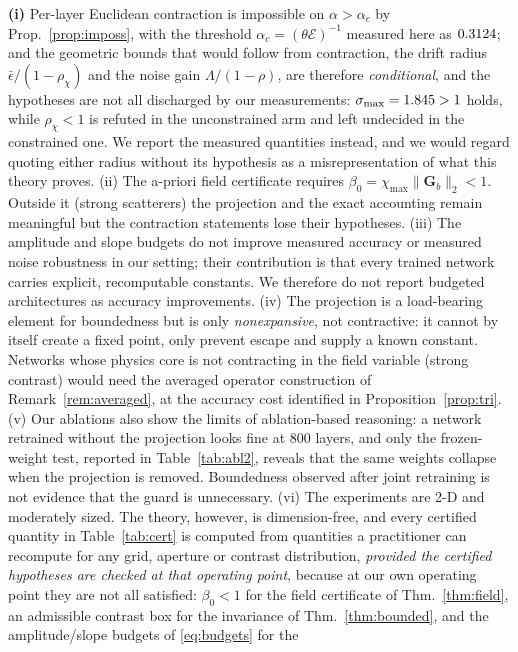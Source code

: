 \documentclass[journal,cmes,article,submit,moreauthors,pdftex]{Definitions/tsp}
\newcommand{\norm}[1]{\lVert #1 \rVert}
\newcommand{\numv}[1]{#1}
\begin{document}
\noindent\textbf{(i)} Per-layer Euclidean contraction is impossible on $\alpha>\alpha_c$ by Prop.~\ref{prop:imposs}, with the
threshold $\alpha_c=(\theta\mathcal{E})^{-1}$ measured here as $\numv{\NumAlphaC}$; and the geometric
bounds that would follow from contraction, the drift radius $\bar\epsilon/(1-\rho_\chi)$ and the
noise gain $\Lambda/(1-\rho)$, are therefore \emph{conditional}, and the hypotheses are not all
discharged by our measurements: $\sigma_{\max}=\numv{\NumPhysSigma}>1$ holds, while $\rho_\chi<1$
is refuted in the unconstrained arm and left undecided in the constrained one. We report the
measured quantities instead, and we would regard quoting either radius without its hypothesis as a
misrepresentation of what this theory proves.
(ii) The a-priori field certificate requires $\beta_0=\chi_{\max}\norm{\mathbf{G}_b}_2<1$. Outside it
(strong scatterers) the projection and the exact accounting remain meaningful but the contraction
statements lose their hypotheses.
(iii) The amplitude and slope budgets do not improve measured accuracy or measured noise robustness
in our setting; their contribution is that every trained network carries explicit, recomputable
constants. We therefore do not report budgeted architectures as accuracy improvements.
(iv) The projection is a load-bearing element for boundedness but is only \emph{nonexpansive}, not
contractive: it cannot by itself create a fixed point, only prevent escape and supply a known
constant. Networks whose physics core is not contracting in the field variable (strong contrast)
would need the averaged operator construction of Remark~\ref{rem:averaged}, at the accuracy cost
identified in Proposition~\ref{prop:tri}.
(v) Our ablations also show the limits of ablation-based reasoning: a network retrained without
the projection looks fine at $800$ layers, and only the frozen-weight test, reported in Table~\ref{tab:abl2}, reveals that the same weights collapse when the projection is removed.
Boundedness observed after joint retraining is not evidence that the guard is unnecessary.
(vi) The experiments are 2-D and moderately sized. The theory, however, is dimension-free, and
every certified quantity in Table~\ref{tab:cert} is computed from quantities a practitioner can
recompute for any grid, aperture or contrast distribution, \emph{provided the certified
hypotheses are checked at that operating point}, because at our own operating point they are not
all satisfied: $\beta_0<1$ for the field certificate of Thm.~\ref{thm:field}, an admissible contrast box for the
invariance of Thm.~\ref{thm:bounded}, and the amplitude/slope budgets of \eqref{eq:budgets} for the
\end{document}
